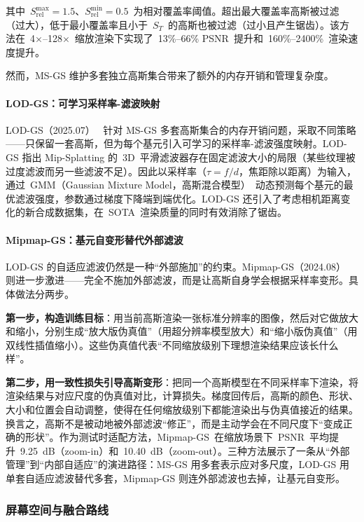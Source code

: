 其中~$S_{\text{rel}}^{\max} = 1.5$、$S_{\text{rel}}^{\min} = 0.5$~为相对覆盖率阈值。超出最大覆盖率高斯被过滤（过大），低于最小覆盖率且小于~$S_T$~的高斯也被过滤（过小且产生锯齿）。该方法在~4$\times$--128$\times$~缩放渲染下实现了~13\%--66\% PSNR~提升和~160\%--2400\%~渲染速度提升。

然而，MS-GS 维护多套独立高斯集合带来了额外的内存开销和管理复杂度。

\paragraph{LOD-GS：可学习采样率-滤波映射}
LOD-GS（2025.07）~\cite{2507_00554} 针对 MS-GS 多套高斯集合的内存开销问题，采取不同策略——只保留一套高斯，但为每个基元引入可学习的采样率-滤波强度映射。LOD-GS 指出 Mip-Splatting 的~3D~平滑滤波器存在固定滤波大小的局限（某些纹理被过度滤波而另一些滤波不足）。因此以采样率（$\tau = f / d$，焦距除以距离）为输入，通过~GMM（Gaussian Mixture Model，高斯混合模型）~动态预测每个基元的最优滤波强度，参数通过梯度下降端到端优化。LOD-GS 还引入了考虑相机距离变化的新合成数据集，在~SOTA~渲染质量的同时有效消除了锯齿。

\paragraph{Mipmap-GS：基元自变形替代外部滤波}
LOD-GS 的自适应滤波仍然是一种“外部施加”的约束。Mipmap-GS（2024.08）~\cite{2408_06286} 则进一步激进——完全不施加外部滤波，而是让高斯自身学会根据采样率变形。具体做法分两步。

\textbf{第一步，构造训练目标}：用当前高斯渲染一张标准分辨率的图像，然后对它做放大和缩小，分别生成“放大版伪真值”（用超分辨率模型放大）和“缩小版伪真值”（用双线性插值缩小）。这些伪真值代表“不同缩放级别下理想渲染结果应该长什么样”。

\textbf{第二步，用一致性损失引导高斯变形}：把同一个高斯模型在不同采样率下渲染，将渲染结果与对应尺度的伪真值对比，计算损失。梯度回传后，高斯的颜色、形状、大小和位置会自动调整，使得在任何缩放级别下都能渲染出与伪真值接近的结果。换言之，高斯不是被动地被外部滤波“修正”，而是主动学会在不同尺度下“变成正确的形状”。作为测试时适配方法，Mipmap-GS~在缩放场景下~PSNR~平均提升~9.25~dB（zoom-in）和~10.40~dB（zoom-out）。三种方法展示了一条从“外部管理”到“内部自适应”的演进路径：MS-GS 用多套表示应对多尺度，LOD-GS 用单套自适应滤波替代多套，Mipmap-GS 则连外部滤波也去掉，让基元自变形。

\subsubsection{屏幕空间与融合路线}

